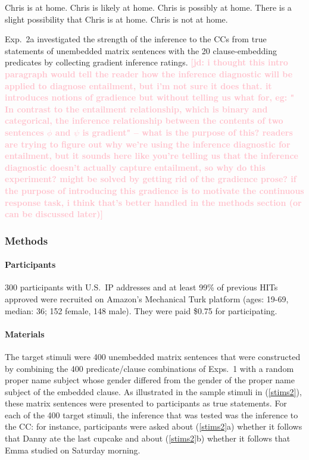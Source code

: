 \documentclass[11pt,fleqn]{article}
\newcommand{\jd}[1]{\textbf{\textcolor{Pink}{[jd: #1]}}}
\newcommand{\6}{\mbox{$[\hspace*{-.6mm}[$}}
\newcommand{\9}{\mbox{$]\hspace*{-.6mm}]$}}
\begin{document}
\begin{exe}
\ex\label{chris}
\begin{xlist}
 Chris is at home.
 Chris is likely at home.
 Chris is possibly at home.
 There is a slight possibility that Chris is at home.
 Chris is not at home.
\end{xlist}
\end{exe}
Exp.~2a investigated the strength of the inference to the CCs from true statements of unembedded matrix sentences with the 20 clause-embedding predicates by collecting gradient inference ratings. \jd{i thought this intro paragraph would tell the reader how the inference diagnostic will be applied to diagnose entailment, but i'm not sure it does that. it introduces notions of gradience but without telling us what for, eg: " In contrast to the entailment relationship, which is binary and categorical, the inference relationship between the contents of two sentences $\phi$ and $\psi$ is gradient" -- what is the purpose of this? readers are trying to figure out why we're using the inference diagnostic for entailment, but it sounds here like you're telling us that the inference diagnostic doesn't actually capture entailment, so why do this experiment? might be solved by getting rid of the gradience prose? if the purpose of introducing this gradience is to motivate the continuous response task, i think that's better handled in the methods section (or can be discussed later)}

\subsubsection{Methods}

\paragraph{Participants} 300 participants with U.S.\ IP addresses and at least 99\% of previous HITs approved were recruited on Amazon's Mechanical Turk platform (ages: 19-69, median: 36; 152 female, 148 male). They were paid \$0.75 for participating.

\paragraph{Materials} The target stimuli were 400 unembedded matrix sentences that were constructed by combining the 400 predicate/clause combinations of Exps.~1 with a random proper name subject whose gender differed from the gender of the proper name subject of the embedded clause. As illustrated in the sample stimuli in (\ref{stims2}), these matrix sentences were presented to participants as true statements. For each of the 400 target stimuli, the inference that was tested was the inference to the CC: for instance, participants were asked about (\ref{stims2}a) whether it follows that Danny ate the last cupcake and about (\ref{stims2}b) whether it follows that Emma studied on Saturday morning.
\end{document}
